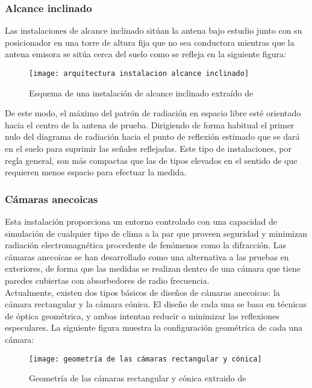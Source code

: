 \subsubsection{Alcance inclinado}

Las instalaciones de alcance inclinado sitúan la antena bajo estudio junto con su posicionador en una torre de altura fija que no sea conductora mientras que la antena emisora se sitúa cerca del suelo como se refleja en la siguiente figura:

\begin{figure}[h] 
  \centering
    \texttt{[image: arquitectura instalacion alcance inclinado]}
    \caption{Esquema de una instalación de alcance inclinado extraído de \cite{Balanis_2016}}
    \label{Esquema de una instalación de alcance inclinado}
\end{figure}


De este modo, el máximo del patrón de radiación en espacio libre esté orientado hacia el centro de la antena de prueba. Dirigiendo de forma habitual el primer nulo del diagrama de radiación hacia el punto de reflexión estimado que se dará en el suelo para suprimir las señales reflejadas. Este tipo de instalaciones, por regla general, son más compactas que las de tipos elevados en el sentido de que requieren menos espacio para efectuar la medida. 

\newpage

 \subsubsection{Cámaras anecoicas}

Esta instalación proporciona un entorno controlado con una capacidad de simulación de cualquier tipo de clima a la par que proveen seguridad y minimizan radiación electromagnética procedente de fenómenos como la difracción. Las cámaras anecoicas se han desarrollado como una alternativa a las pruebas en exteriores, de forma que las medidas se realizan dentro de una cámara que tiene paredes cubiertas con absorbedores de radio frecuencia.\\

Actualmente, existen dos tipos básicos de diseños de cámaras anecoicas: la cámara rectangular y la cámara cónica. El diseño de cada una se basa en técnicas de óptica geométrica, y ambas intentan reducir o minimizar las reflexiones especulares. La siguiente figura muestra la configuración geométrica de cada una cámara:

\begin{figure}[h] 
  \centering
    \texttt{[image: geometría de las cámaras rectangular y cónica]}
    \caption{Geometría de las cámaras rectangular y cónica extraido de \cite{Articulo_Kummer}}
    \label{Esquema de una instalación de alcance inclinado}
\end{figure}

